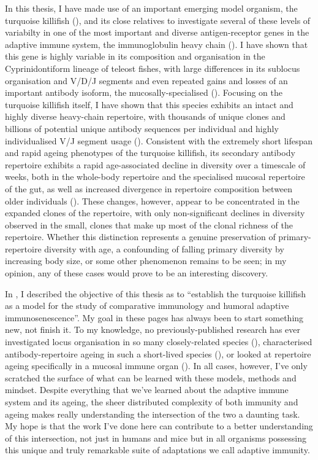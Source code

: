 In this thesis, I have made use of an important emerging model organism, the turquoise killifish (\nfu), and its close relatives to investigate several of these levels of variabilty in one of the most important and diverse antigen-receptor genes in the adaptive immune system, the immunoglobulin heavy chain (\igh{}). I have shown that this gene is highly variable in its composition and organisation in the Cyprinidontiform lineage of teleost fishes, with large differences in its sublocus organisation and V/D/J segments and even repeated gains and losses of an important antibody isoform, the mucosally-specialised  (). Focusing on the turquoise killifish itself, I have shown that this species exhibits an intact and highly diverse heavy-chain repertoire, with thousands of unique clones and billions of potential unique antibody sequences per individual and highly individualised V/J segment usage (). Consistent with the extremely short lifespan and rapid ageing phenotypes of the turquoise killifish, its secondary antibody repertoire exhibits a rapid age-associated decline in diversity over a timescale of weeks, both in the whole-body repertoire and the specialised mucosal repertoire of the gut, as well as increased divergence in repertoire composition between older individuals (). These changes, however, appear to be concentrated in the expanded clones of the repertoire, with only non-significant declines in diversity observed in the small, \naive clones that make up most of the clonal richness of the repertoire. Whether this distinction represents a genuine preservation of primary-repertoire diversity with age, a confounding of falling primary diversity by increasing body size, or some other phenomenon remains to be seen; in my opinion, any of these cases would prove to be an interesting discovery.

In , I described the objective of this thesis as to ``establish the turquoise killifish as a model for the study of comparative immunology and humoral adaptive immunosenescence''. My goal in these pages has always been to start something new, not finish it. To my knowledge, no previously-published research has ever investigated \igh{} locus organisation in so many closely-related species (), characterised antibody-repertoire ageing in such a short-lived species (), or looked at repertoire ageing specifically in a mucosal immune organ (). In all cases, however, I've only scratched the surface of what can be learned with these models, methods and mindset. Despite everything that we've learned about the adaptive immune system and its ageing, the sheer distributed complexity of both immunity and ageing makes really understanding the intersection of the two a daunting task. My hope is that the work I've done here can contribute to a better understanding of this intersection, not just in humans and mice but in all organisms possessing this unique and truly remarkable suite of adaptations we call adaptive immunity. 